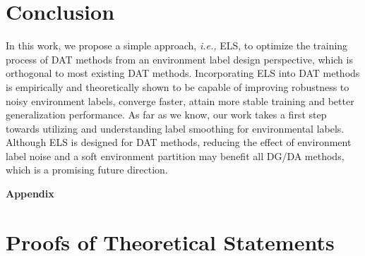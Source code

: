 \documentclass{article} \usepackage{iclr2023_conference,times}
\newcommand{\ls}[0]{ELS\xspace}
\newcommand{\ie}[0]{\textit{i.e., }}
\begin{document}
\section{Conclusion}
In this work, we propose a simple approach, \ie \ls, to optimize the training process of DAT methods from an environment label design perspective, which is orthogonal to most existing DAT methods. Incorporating \ls into DAT methods is empirically and theoretically shown to be capable of improving robustness to noisy environment labels, converge faster, attain more stable training and better generalization performance. As far as we know, our work takes a first step towards utilizing and understanding label smoothing for environmental labels.  Although \ls is designed for DAT methods, reducing the effect of environment label noise and a soft environment partition may benefit all DG/DA methods, which is a promising future direction.







\clearpage
\newpage
\appendix
\begin{center}
{\LARGE \textbf{Appendix}}
\end{center}

{
  \hypersetup{hidelinks}
  \tableofcontents
\noindent\hrulefill
}

\section{Proofs of Theoretical Statements}
\end{document}
